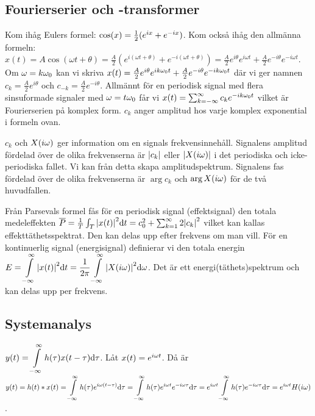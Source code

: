 \documentclass[a4paper]{article}
\begin{document}
\providecommand\fname{}
\renewcommand\fname{19-09-19}

\subsection{Fourierserier och -transformer}
\begin{påm}
    Kom ihåg Eulers formel: \(
        \cos(x) = \frac{1}{2} (e^{ix} + e^{-ix})
    \). Kom också ihåg den allmänna formeln: \(
        x(t) = A \cos(\omega t + \theta)
        = \frac{A}{2} \left( e^{i(\omega t + \theta)} + e^{-i(\omega t + \theta)} \right)
        = \frac{A}{2} e^{i\theta} e^{i\omega t} + \frac{A}{2} e^{-i\theta} e^{-i\omega t}
    \). Om \(
        \omega = k \omega_0
    \) kan vi skriva \(
        x(t) = \frac{A}{2} e^{i\theta} e^{ik\omega_0 t} + \frac{A}{2} e^{-i\theta} e^{-ik\omega_0 t}
    \) där vi ger namnen \(
        c_k = \frac{A}{2} e^{i\theta}
    \) och \(
        c_{-k} = \frac{A}{2} e^{-i\theta}
    \). Allmännt för en periodisk signal med flera sinsuformade signaler med \(
        \omega = t\omega_0
    \) får vi \(
        x(t) = \sum_{k=-\infty}^\infty c_k e^{-ik\omega_0 t}
    \) vilket är Fourierserien på komplex form. \(
        c_k
    \) anger amplitud hos varje komplex exponential i formeln ovan.
\end{påm}

\(
    c_k 
\) och \(
    X(i\omega)
\) ger information om en signals frekvensinnehåll. Signalens amplitud fördelad
över de olika frekvenserna är \(
    \abs{c_k}
\) eller \(
    \abs{X(i\omega)}
\) i det periodiska och icke-periodiska fallet. Vi kan från detta skapa 
amplitudspektrum. Signalens fas fördelad över de olika frekvenserna är \(
    \arg{c_k}
\) och \(
    \arg{X(i\omega)}
\) för de två huvudfallen.

Från Parsevals formel fås för en periodisk signal (effektsignal) den totala
medeleffekten \(
    \overline{P} = \frac{1}{T} \int_T \abs{x(t)}^2 \dd t 
    = c_0^2 + \sum_{k=1}^\infty 2 \abs{c_k}^2
\) vilket kan kallas effekttäthetsspektrat. Den kan delas upp efter frekvens 
om man vill. För en kontinuerlig signal (energisignal) definierar vi
den totala energin \(
    E = \displaystyle\int\limits_{-\infty}^{\infty} \abs{x(t)}^2 \dd t 
    = \frac{1}{2\pi} \displaystyle\int\limits_{-\infty}^{\infty} \abs{X(i\omega)}^2 \dd \omega
\). Det är ett energi(täthets)spektrum och kan delas upp per frekvens.

\subsection{Systemanalys}
\(
    y(t) = \displaystyle\int\limits_{-\infty}^{\infty} h(\tau) x(t-\tau) \dd \tau
\). Låt \(
    x(t) = e^{i\omega t}
\). Då är \(
    y(t) = h(t) * x(t)
    = \displaystyle\int\limits_{-\infty}^{\infty} h(\tau) e^{i\omega (t-\tau)} \dd \tau
    = \displaystyle\int\limits_{-\infty}^{\infty} h(\tau) e^{i\omega t} e^{-i\omega \tau} \dd \tau
    = e^{i\omega t} \displaystyle\int\limits_{-\infty}^{\infty} h(\tau) e^{-i\omega \tau} \dd \tau
    = e^{i\omega t} H(i\omega)
\). 
\end{document}
